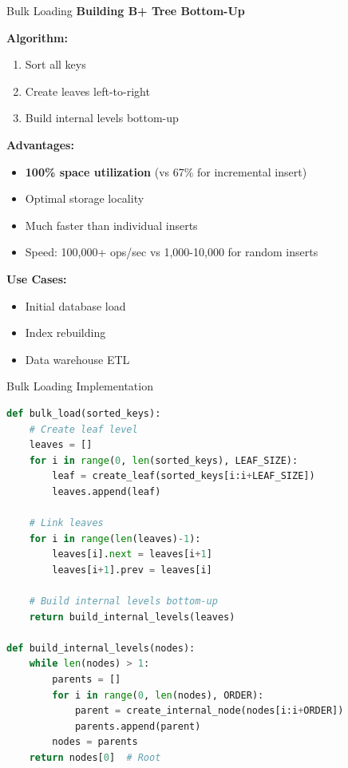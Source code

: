\documentclass[aspectratio=169]{beamer}
\begin{document}
\begin{frame}{Bulk Loading}
  \textbf{Building B+ Tree Bottom-Up}

  \vspace{0.3cm}
  \textbf{Algorithm:}
  \begin{enumerate}
    \item Sort all keys
    \item Create leaves left-to-right
    \item Build internal levels bottom-up
  \end{enumerate}

  \vspace{0.3cm}
  \textbf{Advantages:}
  \begin{itemize}
    \item \textbf{100\% space utilization} (vs 67\% for incremental insert)
    \item Optimal storage locality
    \item Much faster than individual inserts
    \item Speed: 100,000+ ops/sec vs 1,000-10,000 for random inserts
  \end{itemize}

  \vspace{0.3cm}
  \textbf{Use Cases:}
  \begin{itemize}
    \item Initial database load
    \item Index rebuilding
    \item Data warehouse ETL
  \end{itemize}
\end{frame}

\begin{frame}[fragile]{Bulk Loading Implementation}
\begin{lstlisting}[language=Python, basicstyle=\ttfamily\tiny]
def bulk_load(sorted_keys):
    # Create leaf level
    leaves = []
    for i in range(0, len(sorted_keys), LEAF_SIZE):
        leaf = create_leaf(sorted_keys[i:i+LEAF_SIZE])
        leaves.append(leaf)

    # Link leaves
    for i in range(len(leaves)-1):
        leaves[i].next = leaves[i+1]
        leaves[i+1].prev = leaves[i]

    # Build internal levels bottom-up
    return build_internal_levels(leaves)

def build_internal_levels(nodes):
    while len(nodes) > 1:
        parents = []
        for i in range(0, len(nodes), ORDER):
            parent = create_internal_node(nodes[i:i+ORDER])
            parents.append(parent)
        nodes = parents
    return nodes[0]  # Root
\end{lstlisting}
\end{frame}
\end{document}
